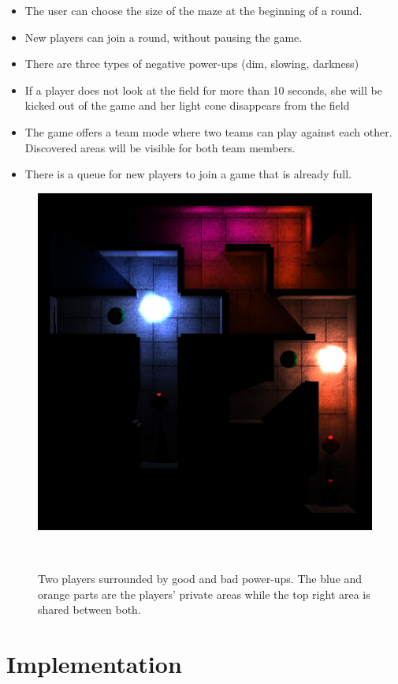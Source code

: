 \documentclass{sigchi}
\begin{document}
	\begin{itemize}
		\item The user can choose the size of the maze at the beginning of a round.
		\item New players can join a round, without pausing the game.
		\item There are three types of negative power-ups (dim, slowing, darkness)
		\item If a player does not look at the field for more than 10 seconds, she will be kicked out of the game and her light cone disappears from the field
		\item The game offers a team mode where two teams can play against each other. Discovered areas will be visible for both team members.
		\item There is a queue for new players to join a game that is already full. 		
	\end{itemize}
\begin{figure}
\centering
  \includegraphics[width=0.9\columnwidth]{figures/maze}
  \caption{Two players surrounded by good and bad power-ups. The blue and orange parts are the players' private areas while the top right area is shared between both. }~\label{fig:figure1}
\end{figure}
\section{Implementation}
\end{document}
